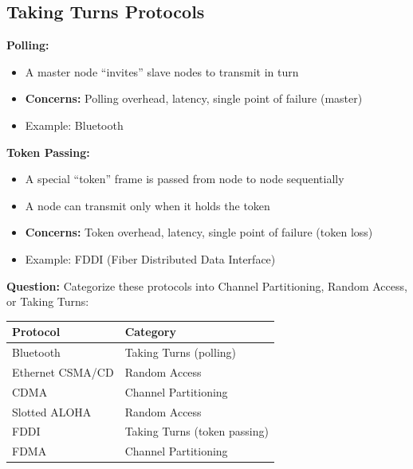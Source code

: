 \subsection{Taking Turns Protocols}

\begin{keybox}
\textbf{Polling:}
\begin{itemize}[noitemsep]
    \item A master node ``invites'' slave nodes to transmit in turn
    \item \textbf{Concerns:} Polling overhead, latency, single point of failure (master)
    \item Example: Bluetooth
\end{itemize}

\textbf{Token Passing:}
\begin{itemize}[noitemsep]
    \item A special ``token'' frame is passed from node to node sequentially
    \item A node can transmit only when it holds the token
    \item \textbf{Concerns:} Token overhead, latency, single point of failure (token loss)
    \item Example: FDDI (Fiber Distributed Data Interface)
\end{itemize}
\end{keybox}

\begin{exambox}
\textbf{Question:} Categorize these protocols into Channel Partitioning, Random Access, or Taking Turns:

\begin{center}
\begin{tabular}{ll}
\toprule
\textbf{Protocol} & \textbf{Category} \\
\midrule
Bluetooth & Taking Turns (polling) \\
Ethernet CSMA/CD & Random Access \\
CDMA & Channel Partitioning \\
Slotted ALOHA & Random Access \\
FDDI & Taking Turns (token passing) \\
FDMA & Channel Partitioning \\
\bottomrule
\end{tabular}
\end{center}
\end{exambox}

